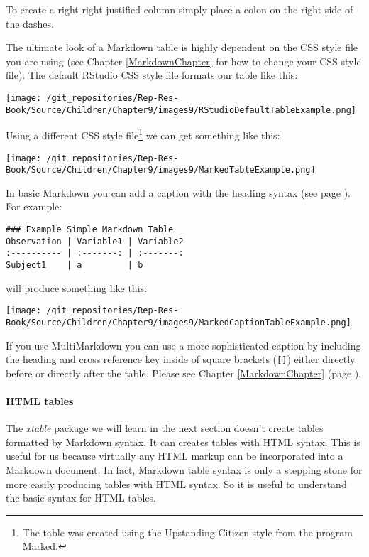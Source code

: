 \noindent To create a right-right justified column simply place a colon on the right side of the dashes. 

The ultimate look of a Markdown table is highly dependent on the CSS style file you are using (see Chapter \ref{MarkdownChapter} for how to change your CSS style file). The default RStudio CSS style file formats our table like this:

\texttt{[image: /git\_repositories/Rep-Res-Book/Source/Children/Chapter9/images9/RStudioDefaultTableExample.png]}

\noindent Using a different CSS style file\footnote{The table was created using the Upstanding Citizen style from the program Marked.} we can get something like this:

\texttt{[image: /git\_repositories/Rep-Res-Book/Source/Children/Chapter9/images9/MarkedTableExample.png]}

\noindent In basic Markdown you can add a caption with the heading syntax (see page \pageref{headings, Markdown}). For example:

\begin{knitrout}
\color{fgcolor}\begin{kframe}
\begin{verbatim}
### Example Simple Markdown Table
Observation | Variable1 | Variable2 
:---------- | :-------: | :-------: 
Subject1    | a         | b         
\end{verbatim}
\end{kframe}
\end{knitrout}


\noindent will produce something like this:

\texttt{[image: /git\_repositories/Rep-Res-Book/Source/Children/Chapter9/images9/MarkedCaptionTableExample.png]}

\noindent If you use MultiMarkdown you can use a more sophisticated caption by including the heading and cross reference key inside of square brackets (\verb|[]|) either directly before or directly after the table. Please see Chapter \ref{MarkdownChapter} (page \pageref{MultiMarkdownDiscussion}).

\paragraph{HTML tables}

The \emph{xtable} package we will learn in the next section doesn't create tables formatted by Markdown syntax. It can creates tables with HTML syntax. This is useful for us because virtually any HTML markup can be incorporated into a Markdown document. In fact, Markdown table syntax is only a stepping stone for more easily producing tables with HTML syntax. So it is useful to understand the basic syntax for HTML tables.

